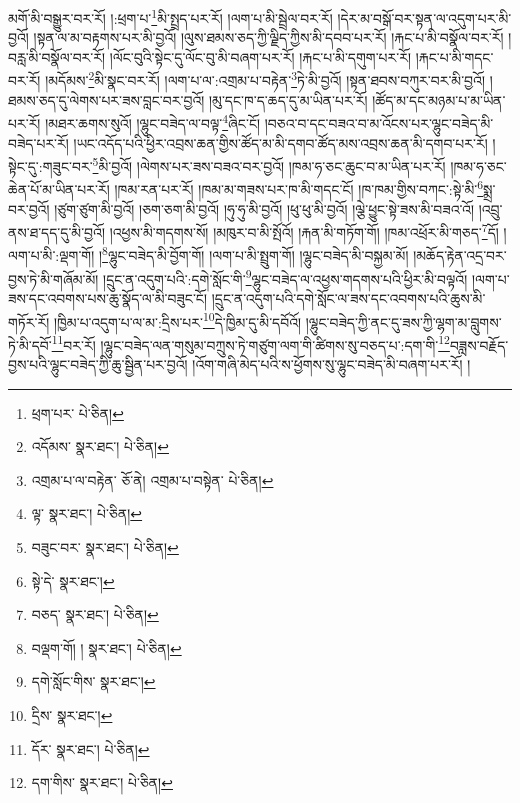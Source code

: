 མགོ་མི་བསྒྱུར་བར་རོ། །:ཕྲག་པ་\footnote{ཕྲག་པར་  པེ་ཅིན། }མི་སྤྲད་པར་རོ། །ལག་པ་མི་སྦྲེལ་བར་རོ། །དེར་མ་བསྒོ་བར་སྟན་ལ་འདུག་པར་མི་བྱའོ། །སྟན་ལ་མ་བརྟགས་པར་མི་བྱའོ། །ལུས་ཐམས་ཅད་ཀྱི་ལྗིད་ཀྱིས་མི་དབབ་པར་རོ། །རྐང་པ་མི་བསྣོལ་བར་རོ། །བརླ་མི་བསྣོལ་བར་རོ། །ལོང་བུའི་སྟེང་དུ་ལོང་བུ་མི་བཞག་པར་རོ། །རྐང་པ་མི་དགུག་པར་རོ། །རྐང་པ་མི་གདང་བར་རོ། །མདོམས་\footnote{འདོམས་  སྣར་ཐང་།  པེ་ཅིན། }མི་སྣང་བར་རོ། །ལག་པ་ལ་:འགྲམ་པ་བརྟེན་\footnote{འགྲམ་པ་ལ་བརྟེན་  ཅོ་ནེ། འགྲམ་པ་བསྟེན་  པེ་ཅིན། }ཏེ་མི་བྱའོ། །སྟན་ཐབས་བཀུར་བར་མི་བྱའོ། །ཐམས་ཅད་དུ་ལེགས་པར་ཟས་བླང་བར་བྱའོ། །མུ་དང་ཁ་ད་ཆད་དུ་མ་ཡིན་པར་རོ། །ཚོད་མ་དང་མཉམ་པ་མ་ཡིན་པར་རོ། །མཐར་ཆགས་སུའོ། །ལྷུང་བཟེད་ལ་བལྟ་\footnote{ལྟ་  སྣར་ཐང་།  པེ་ཅིན། }ཞིང་ངོ། །བཅའ་བ་དང་བཟའ་བ་མ་འོངས་པར་ལྷུང་བཟེད་མི་བཟེད་པར་རོ། །ཡང་འདོད་པའི་ཕྱིར་འབྲས་ཆན་གྱིས་ཚོད་མ་མི་དགབ་ཚོད་མས་འབྲས་ཆན་མི་དགབ་པར་རོ། །སྟེང་དུ་:གཟུང་བར་\footnote{བཟུང་བར་  སྣར་ཐང་།  པེ་ཅིན། }མི་བྱའོ། །ལེགས་པར་ཟས་བཟའ་བར་བྱའོ། །ཁམ་ཧ་ཅང་ཆུང་བ་མ་ཡིན་པར་རོ། །ཁམ་ཧ་ཅང་ཆེན་པོ་མ་ཡིན་པར་རོ། །ཁམ་རན་པར་རོ། །ཁམ་མ་གཟས་པར་ཁ་མི་གདང་ངོ། །ཁ་ཁམ་གྱིས་བཀང་:སྟེ་མི་\footnote{སྟེ་དེ་  སྣར་ཐང་། }སྨྲ་བར་བྱའོ། །ཙུག་ཙུག་མི་བྱའོ། །ཅག་ཅག་མི་བྱའོ། །ཧུ་ཧུ་མི་བྱའོ། །ཕུ་ཕུ་མི་བྱའོ། །ལྕེ་ཕྱུང་སྟེ་ཟས་མི་བཟའ་འོ། །འབྲུ་ནས་ཐ་དད་དུ་མི་བྱའོ། །འཕྱས་མི་གདགས་སོ། །མཁུར་བ་མི་སྤོའོ། །རྐན་མི་གཏོག་གོ། །ཁམ་འཕྲོར་མི་གཅད་\footnote{བཅད་  སྣར་ཐང་།  པེ་ཅིན། }དོ། །ལག་པ་མི་:ལྡག་གོ། །\footnote{བལྡག་གོ། །  སྣར་ཐང་།  པེ་ཅིན། }ལྷུང་བཟེད་མི་བྱོག་གོ། །ལག་པ་མི་སྤྲུག་གོ། །ལྷུང་བཟེད་མི་བསྐྱམ་མོ། །མཆོད་རྟེན་འདྲ་བར་བྱས་ཏེ་མི་གཞོམ་མོ། །དྲུང་ན་འདུག་པའི་:དགེ་སློང་གི་\footnote{དགེ་སློང་གིས་  སྣར་ཐང་། }ལྷུང་བཟེད་ལ་འཕྱས་གདགས་པའི་ཕྱིར་མི་བལྟའོ། །ལག་པ་ཟས་དང་འབགས་པས་ཆུ་སྣོད་ལ་མི་བཟུང་ངོ། །དྲུང་ན་འདུག་པའི་དགེ་སློང་ལ་ཟས་དང་འབགས་པའི་ཆུས་མི་གཏོར་རོ། །ཁྱིམ་པ་འདུག་པ་ལ་མ་:དྲིས་པར་\footnote{དྲིས་  སྣར་ཐང་། }དེ་ཁྱིམ་དུ་མི་དབོའོ། །ལྷུང་བཟེད་ཀྱི་ནང་དུ་ཟས་ཀྱི་ལྷག་མ་བླུགས་ཏེ་མི་དབོ་\footnote{དོར་  སྣར་ཐང་།  པེ་ཅིན། }བར་རོ། །ལྷུང་བཟེད་ལན་གསུམ་བཀྲུས་ཏེ་གཙུག་ལག་གི་ཚིགས་སུ་བཅད་པ་:དག་གི་\footnote{དག་གིས་  སྣར་ཐང་།  པེ་ཅིན། }བཟླས་བརྗོད་བྱས་པའི་ལྷུང་བཟེད་ཀྱི་ཆུ་སྦྱིན་པར་བྱའོ། །འོག་གཞི་མེད་པའི་ས་ཕྱོགས་སུ་ལྷུང་བཟེད་མི་བཞག་པར་རོ། །
